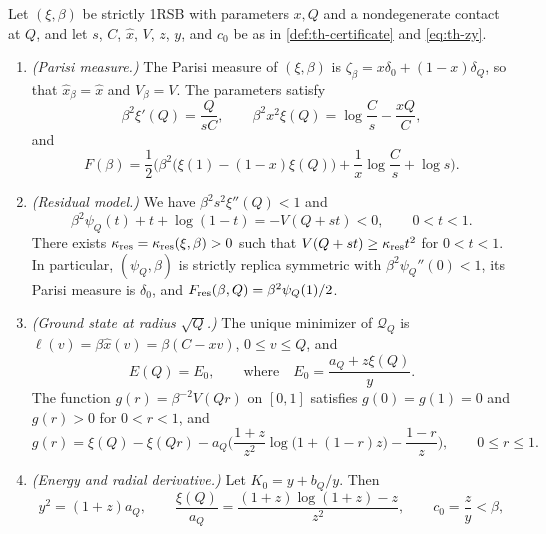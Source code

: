 \begin{proposition}\label{prop:th-structure}
Let $(\xi,\beta)$ be strictly 1RSB with parameters $x,Q$ and a nondegenerate contact at $Q$, and let $s$, $C$, $\hat x$, $V$, $z$, $y$, and $c_0$ be as in \cref{def:th-certificate} and \eqref{eq:th-zy}.
\begin{enumerate}
\item \emph{(Parisi measure.)} The Parisi measure of $(\xi,\beta)$ is $\zeta_\beta=x\delta_0+(1-x)\delta_Q$, so that $\hat x_\beta=\hat x$ and $V_\beta=V$. The parameters satisfy
\begin{equation}\label{eq:th-stationarity}
\beta^2\xi'(Q)=\frac Q{sC},\qquad\beta^2x^2\xi(Q)=\log\frac Cs-\frac{xQ}C,
\end{equation}
and
\begin{equation}\label{eq:th-pressure}
F(\beta)=\frac12\Big(\beta^2\big(\xi(1)-(1-x)\xi(Q)\big)+\frac1x\log\frac Cs+\log s\Big).
\end{equation}
\item \emph{(Residual model.)} We have $\beta^2s^2\xi''(Q)<1$ and
\begin{equation}\label{eq:th-residual}
\beta^2\psi_Q(t)+t+\log(1-t)=-V(Q+st)<0,\qquad 0<t<1.
\end{equation}
There exists $\kappa_{\rm res}=\kappa_{\rm res}(\xi,\beta)>0$ such that $V(Q+st)\ge\kappa_{\rm res}t^2$ for $0<t<1$. In particular, $(\psi_Q,\beta)$ is strictly replica symmetric with $\beta^2\psi_Q''(0)<1$, its Parisi measure is $\delta_0$, and $F_{\rm res}(\beta,Q)=\beta^2\psi_Q(1)/2$.
\item \emph{(Ground state at radius $\sqrt Q$.)} The unique minimizer of $\mathcal Q_Q$ is $\ell(v)=\beta\hat x(v)=\beta(C-xv)$, $0\le v\le Q$, and
\begin{equation}\label{eq:th-E0}
E(Q)=E_0,\qquad\text{where}\quad E_0=\frac{a_Q+z\xi(Q)}y.
\end{equation}
The function $g(r)=\beta^{-2}V(Qr)$ on $[0,1]$ satisfies $g(0)=g(1)=0$ and $g(r)>0$ for $0<r<1$, and
\begin{equation}\label{eq:th-g}
g(r)=\xi(Q)-\xi(Qr)-a_Q\Big(\frac{1+z}{z^2}\log\big(1+(1-r)z\big)-\frac{1-r}z\Big),\qquad 0\le r\le1.
\end{equation}
\item \emph{(Energy and radial derivative.)} Let $K_0=y+b_Q/y$. Then
\begin{equation}\label{eq:th-marks}
y^2=(1+z)a_Q,\qquad\frac{\xi(Q)}{a_Q}=\frac{(1+z)\log(1+z)-z}{z^2},\qquad c_0=\frac zy<\beta,

\end{equation}
\end{enumerate}
\end{proposition}
